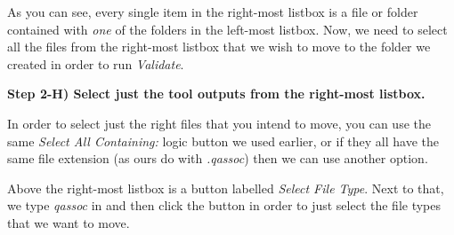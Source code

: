 \documentclass[twoside,a4paper]{refart}
\begin{document}
\begin{center}
\end{center}

As you can see, every single item in the right-most listbox is a file or folder contained with \textit{one} of the folders in the left-most listbox. Now, we need to select all the files from the right-most listbox that we wish to move to the folder we created in order to run \textit{Validate}.

\textbf{Step 2-H) Select just the tool outputs from the right-most listbox.}

In order to select just the right files that you intend to move, you can use the same \textit{Select All Containing:} logic button we used earlier, or if they all have the same file extension (as ours do with \textit{.qassoc}) then we can use another option.

Above the right-most listbox is a button labelled \textit{Select File Type}. Next to that, we type \textit{qassoc} in and then click the button in order to just select the file types that we want to move.
\end{document}
